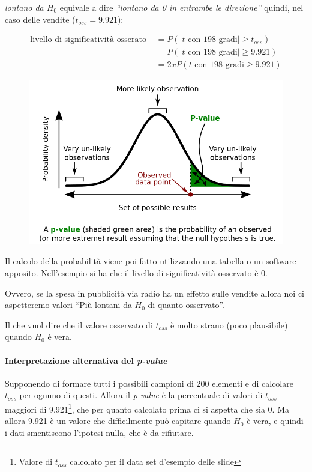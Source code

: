 \emph{lontano da $ H_0 $} equivale a dire \emph{``lontano da 0 in entrambe le
direzione''} quindi, nel caso delle vendite ($ t_{oss} = 9.921 $):

\begin{align*}
\text{livello di significatività osserato } &= P(|t \text{ con 198 gradi}| \geq t_{oss}) \\
																	&= P(|t \text{ con 198 gradi}| \geq 9.921) \\
														           &= 2xP(t \text{ con 198 gradi} \geq 9.921)
\end{align*}

\begin{figure}[htbp]
	\centering
	\includegraphics[width=.7\textwidth]{./notes/immagini/l6-fig7-1.png}
\end{figure}

Il calcolo della probabilità viene poi fatto utilizzando una tabella o
un software apposito. Nell'esempio si ha che il livello di significatività osservato è 0.

Ovvero, se la spesa in pubblicità via radio ha un effetto sulle vendite allora noi ci aspetteremo valori ``Più lontani da $ H_0 $ di quanto
osservato''.

Il che vuol dire che il valore osservato di $ t_{oss} $ è molto strano (poco plausibile) quando $ H_0 $ è vera.

\paragraph{Interpretazione alternativa del \textit{p-value}} Supponendo di formare tutti i possibili campioni di 200 elementi e di calcolare $ t_{oss} $ per ognuno di questi. Allora il \textit{p-value} è la percentuale di valori di $ t_{oss} $ maggiori di 9.921\footnote{Valore di $ t_{oss} $ calcolato per il data set d'esempio delle slide}, che per quanto calcolato prima ci si aspetta che sia 0. Ma allora 9.921 è un valore che difficilmente può capitare quando $ H_0 $ è vera, e quindi i dati smentiscono l'ipotesi nulla, che è da rifiutare.

